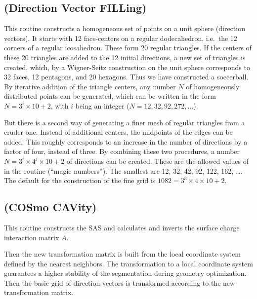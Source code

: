 \subsection*{ (Direction Vector FILLing)}
This routine constructs  a homogeneous set of points on a unit sphere
(direction vectors).  It starts with  12 face-centers on a regular
dodecahedron, i.e.\ the 12 corners of a regular icosahedron. These form 20
regular triangles.  If the centers of these 20 triangles are added to the 12
initial directions, a new set of triangles is created, which, by a Wigner-Seitz
construction on the unit sphere corresponds to 32 faces, 12 pentagons, and 20
hexagons.  Thus we have constructed a soccerball.  By iterative addition of the
triangle centers, any number $N$ of homogeneously distributed points can be
generated, which can be written in the form $N=3^i\times 10+2$,  with $i$ being
an integer ($N=12, 32, 92, 272, \ldots$).

But there is a second way of generating a finer mesh of regular triangles from
a cruder one.  Instead of additional centers, the midpoints of the edges can be
added. This roughly corresponds to an increase in the number of directions by a
factor  of four, instead of three.  By combining these two procedures, a number
$N=3^i\times 4^j\times 10+2$ of directions can be created.  These  are the
allowed values of  in the  routine (``magic numbers'').
The smallest are 12, 32, 42, 92, 122, 162, \ldots . The default for the
construction of the fine grid is $1082 = 3^3\times 4\times 10+2$.

\subsection*{ (COSmo CAVity)}
This routine constructs the SAS and calculates and inverts the surface charge
interaction matrix $A$. 

Then the new transformation matrix is built from the local coordinate system 
defined by the nearest neighbors.  The transformation to a local coordinate 
system guarantees a higher stability of the segmentation during geometry
optimization.  Then the basic grid of direction vectors is transformed 
according to the new transformation matrix.

